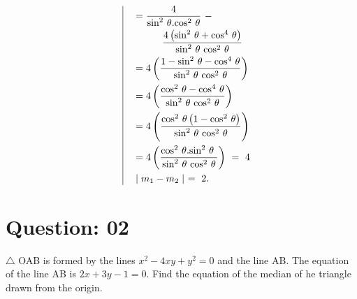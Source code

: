 \documentclass[17pt]{extarticle}
\begin{document}
\begin{fleqn}
\begin{equation}
\begin{alignedat}{4}
\end{alignedat}
\quad
\vrule
\quad
\begin{alignedat}{4}
& = \frac{4}{\text {sin}^2\ \theta.\text {cos}^2\ \theta}\ - \\ 
& \ \ \ \  \ \ \ \ \ \frac{4 \left( \text {sin}^2\ \theta + \text {cos}^4\ \theta \right)}{\text {sin}^2\ \theta\ \text {cos}^2\ \theta} \\ 
& = 4\left( \frac{1 - \text {sin}^2\ \theta - \text {cos}^4\ \theta }{\text {sin}^2\ \theta\ \text {cos}^2\ \theta} \right) \\
& = 4\left( \frac{\text {cos}^2\ \theta - \text {cos}^4\ \theta }{\text {sin}^2\ \theta\ \text {cos}^2\ \theta} \right) \\
& = 4\left( \frac{\text {cos}^2\ \theta\left( 1- \text {cos}^2\ \theta \right) }{\text {sin}^2\ \theta\ \text {cos}^2\ \theta} \right) \\
& = 4\left( \frac{\text {cos}^2\ \theta.\text {sin}^2\ \theta\  }{\text {sin}^2\ \theta\ \text {cos}^2\ \theta} \right)\ = \ 4 \\
& \mid m_1-m_2 \mid \ = \ 2. 
\end{alignedat}
\end{equation}



\section{Question: 02}
$\triangle$ OAB is formed by the lines $ x^2 - 4xy + y^2 = 0 $ and the line AB. The equation of the line AB is $2x + 3y - 1 = 0$. Find the equation of the median of he triangle drawn from the origin. 
 


\end{fleqn}
\end{document}
